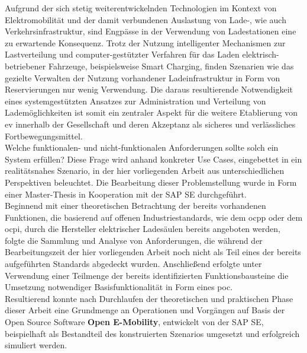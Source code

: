 
\Abstract
Aufgrund der sich stetig weiterentwickelnden Technologien im Kontext von Elektromobilit\"at und der damit verbundenen Auslastung von Lade-, wie auch Verkehrsinfrastruktur, sind Engp\"asse in der Verwendung von Ladestationen eine zu erwartende Konsequenz. 
Trotz der Nutzung intelligenter Mechanismen zur Lastverteilung und computer-gest\"utzter Verfahren f\"ur das Laden elektrisch-betriebener Fahrzeuge, beispielsweise Smart Charging, finden Szenarien wie das gezielte Verwalten der Nutzung vorhandener Ladeinfrastruktur in Form von Reservierungen nur wenig Verwendung.
Die daraus resultierende Notwendigkeit eines systemgest\"utzten Ansatzes zur Administration und Verteilung von Ladem\"oglichkeiten ist somit ein zentraler Aspekt f\"ur die weitere Etablierung von \acrfull{ev} innerhalb der Gesellschaft und deren Akzeptanz als sicheres und verl\"assliches Fortbewegungsmittel.\\
Welche funktionalen- und nicht-funktionalen Anforderungen sollte solch ein System erf\"ullen? Diese Frage wird anhand konkreter Use Cases, eingebettet in ein realitätsnahes Szenario, in der hier vorliegenden Arbeit aus unterschiedlichen Perspektiven beleuchtet. 
Die Bearbeitung dieser Problemstellung wurde in Form einer Master-Thesis in Kooperation mit der SAP SE durchgef\"uhrt.\\
Beginnend mit einer theoretischen Betrachtung der bereits vorhandenen Funktionen, die basierend auf offenen Industriestandards, wie dem \acrfull{ocpp} oder dem \acrfull{ocpi}, durch die Hersteller elektrischer Lades\"aulen bereits angeboten werden, folgte die Sammlung und Analyse von Anforderungen, die w\"ahrend der Bearbeitungszeit der hier vorliegenden Arbeit noch nicht als Teil eines der bereits aufgeführten Standards abgedeckt wurden.
Anschließend erfolgte unter Verwendung einer Teilmenge der bereits identifizierten Funktionsbausteine die Umsetzung notwendiger Basisfunktionalität in Form eines \acrshort{poc}.\\
Resultierend konnte nach Durchlaufen der theoretischen und praktischen Phase dieser Arbeit eine Grundmenge an Operationen und Vorg\"angen auf Basis der Open Source Software \textbf{Open E-Mobility}, entwickelt von der SAP SE, beispielhaft als Bestandteil des konstruierten Szenarios umgesetzt und erfolgreich simuliert werden. 
